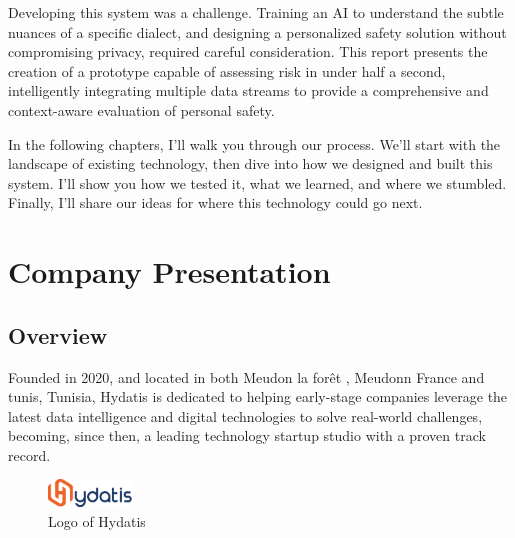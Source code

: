 \documentclass[12pt,a4paper,oneside,english]{book}
\begin{document}
Developing this system was a challenge. Training an AI to understand the subtle nuances of a specific dialect, and designing a personalized safety solution without compromising privacy, required careful consideration. This report presents the creation of a  prototype capable of assessing risk in under half a second, intelligently integrating multiple data streams to provide a comprehensive and context-aware evaluation of personal safety.

In the following chapters, I'll walk you through our process. We'll start with the landscape of existing technology, then dive into how we designed and built this system. I'll show you how we tested it, what we learned, and where we stumbled. Finally, I'll share our ideas for where this technology could go next.



\chapter{Company Presentation} %
\label{ch:1er}
\section{Overview}
Founded in 2020, and located in both Meudon la forêt , Meudonn France and tunis, Tunisia, 
Hydatis is dedicated to helping early-stage companies leverage the latest data intelligence and digital technologies to solve real-world challenges, becoming, since then, a leading technology startup studio with a proven track record.
\begin{figure}[h!] %
    \centering
    \includegraphics[width=0.2\textwidth]{images/hydatiss.png}
    \caption{Logo of Hydatis}
    \label{fig:hydatis}
\end{figure}
\end{document}
